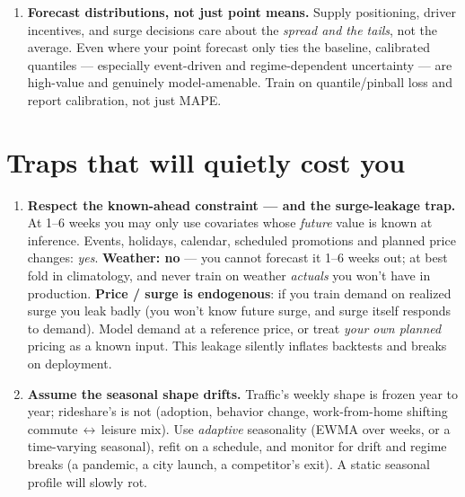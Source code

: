 \documentclass[11pt]{article}
\begin{document}
\begin{enumerate}[leftmargin=*,resume]
\item \textbf{Forecast distributions, not just point means.} Supply positioning,
driver incentives, and surge decisions care about the \emph{spread and the tails},
not the average. Even where your point forecast only ties the baseline, calibrated
quantiles --- especially event-driven and regime-dependent uncertainty --- are
high-value and genuinely model-amenable. Train on quantile/pinball loss and report
calibration, not just MAPE.
\end{enumerate}

\section{Traps that will quietly cost you}

\begin{enumerate}[leftmargin=*,resume]
\item \textbf{Respect the known-ahead constraint --- and the surge-leakage trap.} At
1--6 weeks you may only use covariates whose \emph{future} value is known at
inference. Events, holidays, calendar, scheduled promotions and planned price
changes: \emph{yes}. \textbf{Weather: no} --- you cannot forecast it 1--6 weeks out;
at best fold in climatology, and never train on weather \emph{actuals} you won't
have in production. \textbf{Price / surge is endogenous}: if you train demand on
realized surge you leak badly (you won't know future surge, and surge itself
responds to demand). Model demand at a reference price, or treat \emph{your own
planned} pricing as a known input. This leakage silently inflates backtests and
breaks on deployment.

\item \textbf{Assume the seasonal shape drifts.} Traffic's weekly shape is frozen
year to year; rideshare's is not (adoption, behavior change, work-from-home shifting
commute\,$\leftrightarrow$\,leisure mix). Use \emph{adaptive} seasonality (EWMA over
weeks, or a time-varying seasonal), refit on a schedule, and monitor for drift and
regime breaks (a pandemic, a city launch, a competitor's exit). A static seasonal
profile will slowly rot.


\end{enumerate}
\end{document}
